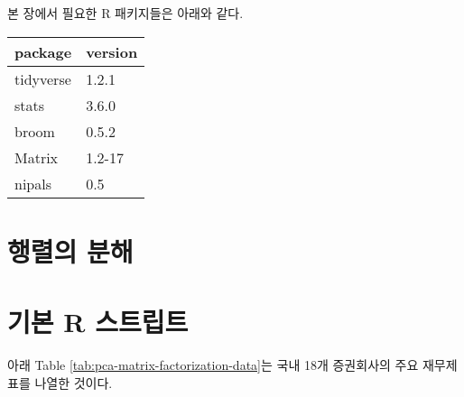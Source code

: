 \documentclass[]{book}
\begin{document}
본 장에서 필요한 R 패키지들은 아래와 같다.

\begin{tabular}{l|l}
\hline
package & version\\
\hline
tidyverse & 1.2.1\\
\hline
stats & 3.6.0\\
\hline
broom & 0.5.2\\
\hline
Matrix & 1.2-17\\
\hline
nipals & 0.5\\
\hline
\end{tabular}

\hypertarget{pca-matrix-factorization}{%
\section{행렬의 분해}\label{pca-matrix-factorization}}

\hypertarget{pca-matrix-factorization-basic-script}{%
\section{기본 R 스트립트}\label{pca-matrix-factorization-basic-script}}

아래 Table \ref{tab:pca-matrix-factorization-data}는 국내 18개 증권회사의 주요 재무제표를 나열한 것이다.
\end{document}
